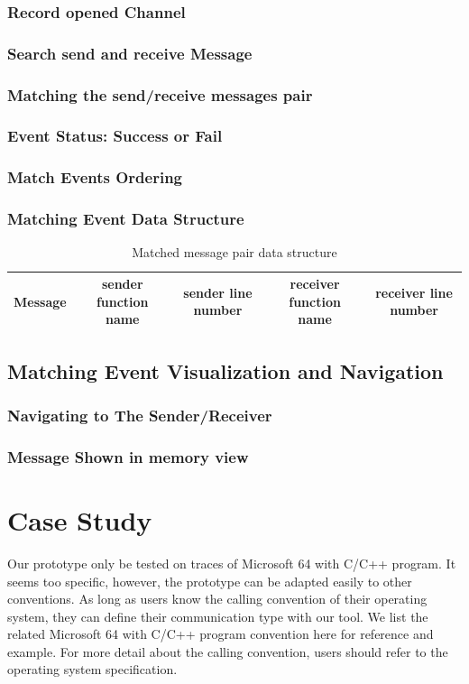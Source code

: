 \documentclass[paper=a4, fontsize=11pt]{scrartcl}
\numberwithin{equation}{section}		%
\numberwithin{figure}{section}			%
\numberwithin{table}{section}				%
\begin{document}
\subsubsection{Record opened Channel}

\subsubsection{Search send and receive Message}
\subsubsection{Matching the send/receive messages pair}
\subsubsection{Event Status: Success or Fail}
\subsubsection{Match Events Ordering}
\subsubsection{Matching Event Data Structure}
\begin{table}[h]
 \begin{center}
  \caption{Matched message pair data structure}
\label{table2}
\begin{tabular}{|c|c|c|c|c|}
      \hline
         Message& sender function name & sender line number  & receiver function name & receiver line number \\
       \hline
\end{tabular}
\end{center}
\end{table}
\subsection{Matching Event Visualization and Navigation}
\subsubsection{Navigating to The Sender/Receiver}
\subsubsection{Message Shown in memory view}


\section{Case Study}
Our prototype only be tested on traces of Microsoft 64 with C/C++ program. It seems too specific, however, the prototype can be adapted easily to other conventions. As long as users know the calling convention of their operating system, they can define their communication type with our tool. We list the related Microsoft 64 with C/C++ program convention here for reference and example. For more detail about the calling convention, users should refer to the operating system specification.\par
\end{document}
